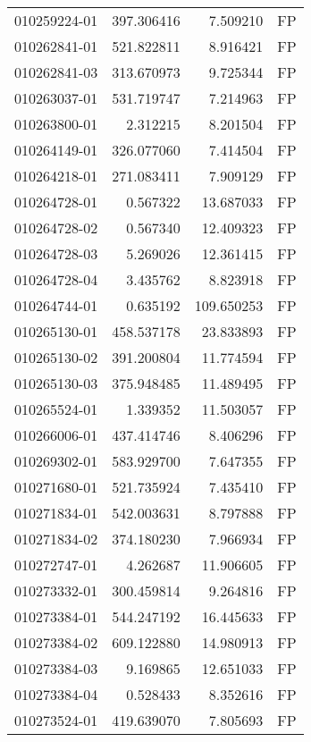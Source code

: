 \begin{tabular}{lrrl}
010259224-01 &  397.306416 &       7.509210 &   FP \\
010262841-01 &  521.822811 &       8.916421 &   FP \\
010262841-03 &  313.670973 &       9.725344 &   FP \\
010263037-01 &  531.719747 &       7.214963 &   FP \\
010263800-01 &    2.312215 &       8.201504 &   FP \\
010264149-01 &  326.077060 &       7.414504 &   FP \\
010264218-01 &  271.083411 &       7.909129 &   FP \\
010264728-01 &    0.567322 &      13.687033 &   FP \\
010264728-02 &    0.567340 &      12.409323 &   FP \\
010264728-03 &    5.269026 &      12.361415 &   FP \\
010264728-04 &    3.435762 &       8.823918 &   FP \\
010264744-01 &    0.635192 &     109.650253 &   FP \\
010265130-01 &  458.537178 &      23.833893 &   FP \\
010265130-02 &  391.200804 &      11.774594 &   FP \\
010265130-03 &  375.948485 &      11.489495 &   FP \\
010265524-01 &    1.339352 &      11.503057 &   FP \\
010266006-01 &  437.414746 &       8.406296 &   FP \\
010269302-01 &  583.929700 &       7.647355 &   FP \\
010271680-01 &  521.735924 &       7.435410 &   FP \\
010271834-01 &  542.003631 &       8.797888 &   FP \\
010271834-02 &  374.180230 &       7.966934 &   FP \\
010272747-01 &    4.262687 &      11.906605 &   FP \\
010273332-01 &  300.459814 &       9.264816 &   FP \\
010273384-01 &  544.247192 &      16.445633 &   FP \\
010273384-02 &  609.122880 &      14.980913 &   FP \\
010273384-03 &    9.169865 &      12.651033 &   FP \\
010273384-04 &    0.528433 &       8.352616 &   FP \\
010273524-01 &  419.639070 &       7.805693 &   FP \\

\end{tabular}
